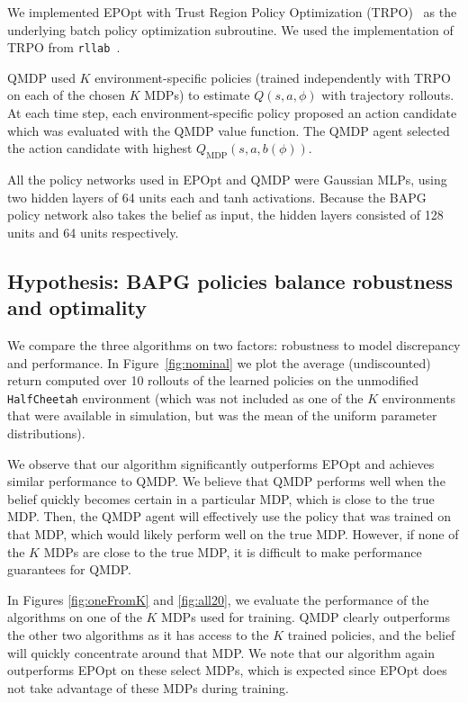 \documentclass{article}
\newcommand{\figref}[1]{Figure~\ref{#1}}%
\begin{document}
We implemented EPOpt with Trust Region Policy Optimization (TRPO)~\cite{trpo} as the underlying batch policy optimization subroutine.
We used the implementation of TRPO from \texttt{rllab}~\cite{duan2016benchmarking}.

QMDP used $K$ environment-specific policies (trained independently with TRPO on each of the chosen $K$ MDPs) to estimate $Q(s, a, \phi)$ with trajectory rollouts.
At each time step, each environment-specific policy proposed an action candidate which was evaluated with the QMDP value function.
The QMDP agent selected the action candidate with highest $Q_{\text{MDP}}(s, a, b(\phi))$.

All the policy networks used in EPOpt and QMDP were Gaussian MLPs, using two hidden layers of 64 units each and tanh activations.
Because the BAPG policy network also takes the belief as input, the hidden layers consisted of 128 units and 64 units respectively.

\subsection{Hypothesis: BAPG policies balance robustness and optimality}

We compare the three algorithms on two factors: robustness to model discrepancy and performance.
In \figref{fig:nominal} we plot the average (undiscounted) return computed over 10 rollouts of the learned policies on the unmodified \texttt{HalfCheetah} environment (which was not included as one of the $K$ environments that were available in simulation, but was the mean of the uniform parameter distributions).

We observe that our algorithm significantly outperforms EPOpt and achieves similar performance to QMDP.
We believe that QMDP performs well when the belief quickly becomes certain in a particular MDP, which is close to the true MDP.
Then, the QMDP agent will effectively use the policy that was trained on that MDP, which would likely perform well on the true MDP.
However, if none of the $K$ MDPs are close to the true MDP, it is difficult to make performance guarantees for QMDP.

In Figures \ref{fig:oneFromK} and \ref{fig:all20}, we evaluate the performance of the algorithms on one of the $K$ MDPs used for training.
QMDP clearly outperforms the other two algorithms as it has access to the $K$ trained policies, and the belief will quickly concentrate around that MDP.
We note that our algorithm again outperforms EPOpt on these select MDPs, which is expected since EPOpt does not take advantage of these MDPs during training.
\end{document}
